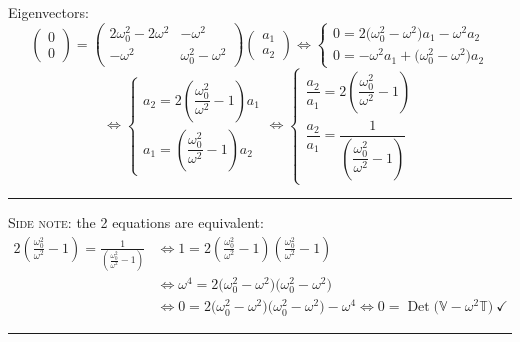 \documentclass[11pt]{article}
\newcommand{\Vm}{\mathbb{V}}
\newcommand{\Tm}{\mathbb{T}}
\begin{document}
Eigenvectors:
\begin{equation*}
  \begin{pmatrix}0\\ 0\end{pmatrix}
  = \begin{pmatrix}
      2\omega_0^2 - 2\omega^2 & -\omega^2\\[2pt]
      -\omega^2 & \omega_0^2 - \omega^2
    \end{pmatrix}
    \begin{pmatrix}a_1\\ a_2\end{pmatrix}
  \iff
  \begin{cases}
    0 = 2\bigl(\omega_0^2-\omega^2\bigr)a_1 - \omega^2 a_2\\[4pt]
    0 = -\omega^2 a_1 + \bigl(\omega_0^2-\omega^2\bigr)a_2
  \end{cases}
\end{equation*}
\begin{equation*}
  \iff
  \begin{cases}
    a_2 = 2\!\left(\dfrac{\omega_0^2}{\omega^2}-1\right) a_1\\[10pt]
    a_1 = \left(\dfrac{\omega_0^2}{\omega^2}-1\right) a_2
  \end{cases}
  \iff
  \begin{cases}
    \dfrac{a_2}{a_1} = 2\!\left(\dfrac{\omega_0^2}{\omega^2}-1\right)\\[12pt]
    \dfrac{a_2}{a_1} = \dfrac{1}{\left(\dfrac{\omega_0^2}{\omega^2}-1\right)}
  \end{cases}
\end{equation*}

\hrule\vspace{4pt}

\noindent\textsc{Side note:} the 2 equations are equivalent:
\begin{align*}
  2\!\left(\frac{\omega_0^2}{\omega^2}-1\right)
    = \frac{1}{\left(\frac{\omega_0^2}{\omega^2}-1\right)}
  &\iff
  1 = 2\!\left(\frac{\omega_0^2}{\omega^2}-1\right)\!\left(\frac{\omega_0^2}{\omega^2}-1\right)\\
  &\iff
  \omega^4 = 2\bigl(\omega_0^2-\omega^2\bigr)\bigl(\omega_0^2-\omega^2\bigr)\\
  &\iff
  0 = 2\bigl(\omega_0^2-\omega^2\bigr)\bigl(\omega_0^2-\omega^2\bigr) - \omega^4
   \iff
  0 = \operatorname{Det}\bigl(\Vm - \omega^2\Tm\bigr) \ \checkmark
\end{align*}

\hrule\vspace{6pt}
\end{document}
